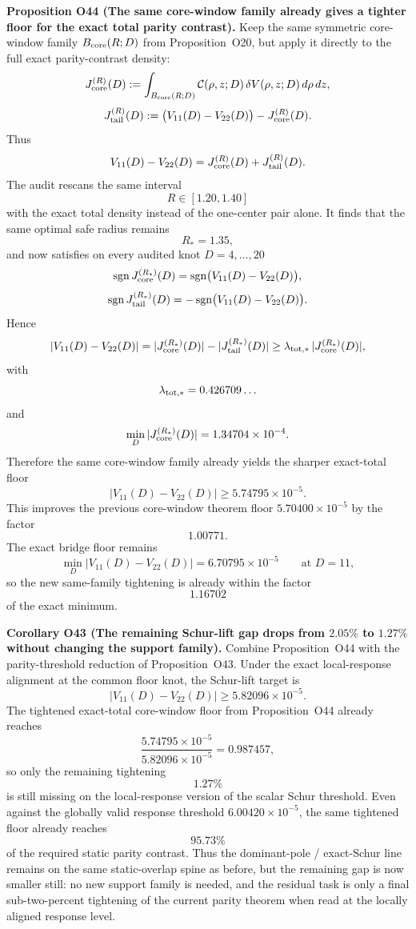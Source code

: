 \documentclass[aps,prd,onecolumn,notitlepage,nofootinbib,superscriptaddress,11pt,floatfix]{revtex4-2}
\begin{document}
\medskip\noindent\textbf{Proposition O44 (The same core-window family already gives a tighter floor for the exact total parity contrast).}
Keep the same symmetric core-window family \(B_{\rm core}(R;D)\) from Proposition~O20, but apply it directly to the full exact parity-contrast density:
\[
J_{\rm core}^{(R)}(D)
:=
\int_{B_{\rm core}(R;D)}
\mathcal C(\rho,z;D)\,\delta V(\rho,z;D)\,d\rho\,dz,
\]
\[
J_{\rm tail}^{(R)}(D)
:=
\bigl(V_{11}(D)-V_{22}(D)\bigr)-J_{\rm core}^{(R)}(D).
\]
Thus
\[
V_{11}(D)-V_{22}(D)=J_{\rm core}^{(R)}(D)+J_{\rm tail}^{(R)}(D).
\]
The audit
rescans the same interval
\[
R\in[1.20,1.40]
\]
with the exact total density instead of the one-center pair alone.  It finds that the same optimal safe radius remains
\[
R_\ast=1.35,
\]
and now satisfies on every audited knot \(D=4,\dots,20\)
\[
\operatorname{sgn}J_{\rm core}^{(R_\ast)}(D)
=
\operatorname{sgn}\bigl(V_{11}(D)-V_{22}(D)\bigr),
\]
\[
\operatorname{sgn}J_{\rm tail}^{(R_\ast)}(D)
=
-\operatorname{sgn}\bigl(V_{11}(D)-V_{22}(D)\bigr).
\]
Hence
\[
|V_{11}(D)-V_{22}(D)|
=
|J_{\rm core}^{(R_\ast)}(D)|
-|J_{\rm tail}^{(R_\ast)}(D)|
\ge
\lambda_{\rm tot,\ast}\,|J_{\rm core}^{(R_\ast)}(D)|,
\]
with
\[
\lambda_{\rm tot,\ast}=0.426709\ldots
\]
and
\[
\min_D |J_{\rm core}^{(R_\ast)}(D)|
=
1.34704\times10^{-4}.
\]
Therefore the same core-window family already yields the sharper exact-total floor
\[
|V_{11}(D)-V_{22}(D)|
\ge
5.74795\times10^{-5}.
\]
This improves the previous core-window theorem floor \(5.70400\times10^{-5}\) by the factor
\[
1.00771.
\]
The exact bridge floor remains
\[
\min_D |V_{11}(D)-V_{22}(D)|=6.70795\times10^{-5}
\qquad\text{at }D=11,
\]
so the new same-family tightening is already within the factor
\[
1.16702
\]
of the exact minimum.

\medskip\noindent\textbf{Corollary O43 (The remaining Schur-lift gap drops from \(2.05\%\) to \(1.27\%\) without changing the support family).}
Combine Proposition~O44 with the parity-threshold reduction of Proposition~O43.  Under the exact local-response alignment at the common floor knot, the Schur-lift target is
\[
|V_{11}(D)-V_{22}(D)|\ge 5.82096\times10^{-5}.
\]
The tightened exact-total core-window floor from Proposition~O44 already reaches
\[
\frac{5.74795\times10^{-5}}{5.82096\times10^{-5}}
=
0.987457,
\]
so only the remaining tightening
\[
1.27\%
\]
is still missing on the local-response version of the scalar Schur threshold.  Even against the globally valid response threshold \(6.00420\times10^{-5}\), the same tightened floor already reaches
\[
95.73\%
\]
of the required static parity contrast.  Thus the dominant-pole / exact-Schur line remains on the same static-overlap spine as before, but the remaining gap is now smaller still: no new support family is needed, and the residual task is only a final sub-two-percent tightening of the current parity theorem when read at the locally aligned response level.
\end{document}
